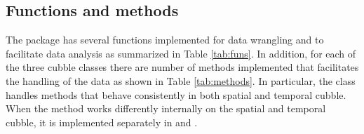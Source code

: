 \documentclass[
  shortnames]{jss}
\begin{document}
\hypertarget{functions-and-methods}{%
\subsection{Functions and methods}\label{functions-and-methods}}

The  package has several functions implemented for data wrangling and to facilitate data analysis as summarized in Table \ref{tab:funs}. In addition, for each of the three cubble classes there are number of methods implemented that facilitates the handling of the data as shown in Table \ref{tab:methods}. In particular, the  class handles methods that behave consistently in both spatial and temporal cubble. When the method works differently internally on the spatial and temporal cubble, it is implemented separately in  and .
\end{document}
